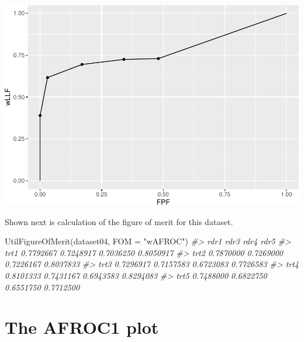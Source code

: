 \documentclass[
]{book}
\newenvironment{Shaded}{\begin{snugshade}}{\end{snugshade}}
\newcommand{\AttributeTok}[1]{\textcolor[rgb]{0.77,0.63,0.00}{#1}}
\newcommand{\CommentTok}[1]{\textcolor[rgb]{0.56,0.35,0.01}{\textit{#1}}}
\newcommand{\DecValTok}[1]{\textcolor[rgb]{0.00,0.00,0.81}{#1}}
\newcommand{\FunctionTok}[1]{\textcolor[rgb]{0.00,0.00,0.00}{#1}}
\newcommand{\NormalTok}[1]{#1}
\newcommand{\OtherTok}[1]{\textcolor[rgb]{0.56,0.35,0.01}{#1}}
\newcommand{\SpecialCharTok}[1]{\textcolor[rgb]{0.00,0.00,0.00}{#1}}
\newcommand{\StringTok}[1]{\textcolor[rgb]{0.31,0.60,0.02}{#1}}
\begin{document}
\begin{Shaded}
\end{Shaded}

\includegraphics{13a-froc-empirical1_files/figure-latex/unnamed-chunk-10-1.pdf}

Shown next is calculation of the figure of merit for this dataset.

\begin{Shaded}
\begin{Highlighting}[]
\FunctionTok{UtilFigureOfMerit}\NormalTok{(dataset04, }\AttributeTok{FOM =} \StringTok{"wAFROC"}\NormalTok{)}
\CommentTok{\#\textgreater{}           rdr1      rdr3      rdr4      rdr5}
\CommentTok{\#\textgreater{} trt1 0.7792667 0.7248917 0.7036250 0.8050917}
\CommentTok{\#\textgreater{} trt2 0.7870000 0.7269000 0.7226167 0.8037833}
\CommentTok{\#\textgreater{} trt3 0.7296917 0.7157583 0.6723083 0.7726583}
\CommentTok{\#\textgreater{} trt4 0.8101333 0.7431167 0.6943583 0.8294083}
\CommentTok{\#\textgreater{} trt5 0.7488000 0.6822750 0.6551750 0.7712500}
\end{Highlighting}
\end{Shaded}

\hypertarget{froc-empirical-AFROC1}{%
\section{The AFROC1 plot}\label{froc-empirical-AFROC1}}
\end{document}
